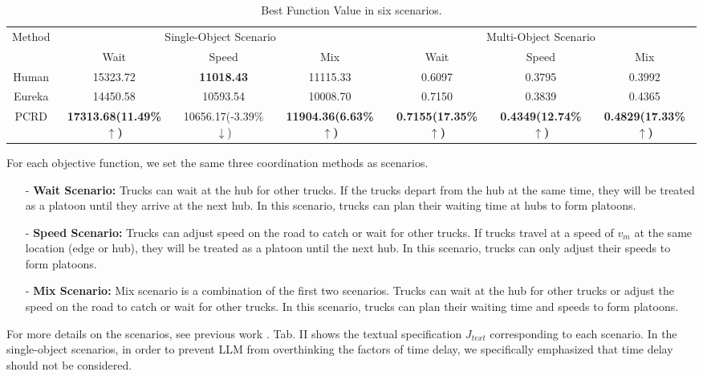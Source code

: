 \documentclass[lettersize,journal]{IEEEtran}
\begin{document}
\begin{table}[t]
\centering
\caption{Best Function Value in six scenarios.}
\begin{tabular}{ccccccc}
\toprule
\multirow{2}{*}{Method} & \multicolumn{3}{c}{Single-Object Scenario}                                                 & \multicolumn{3}{c}{Multi-Object Scenario}                                                     \\
\cmidrule(r){2-4} \cmidrule(r){5-7}
                        & Wait                       & Speed             & Mix                       & Wait                     & Speed                    & Mix                      \\
                        \cmidrule(r){1-1} \cmidrule(r){2-4} \cmidrule(r){5-7}
Human                   & 15323.72                   & \textbf{11018.43} & 11115.33                  & 0.6097                   & 0.3795                   & 0.3992                   \\
Eureka                  & 14450.58                   & 10593.54          & 10008.70                  & 0.7150                   & 0.3839                   & 0.4365                   \\
PCRD                    & \textbf{17313.68(11.49\%$\uparrow$)} & 10656.17(-3.39\%$\downarrow$) & \textbf{11904.36(6.63\%$\uparrow$)} & \textbf{0.7155(17.35\%$\uparrow$)} & \textbf{0.4349(12.74\%$\uparrow$)} & \textbf{0.4829(17.33\%$\uparrow$)} \\ \bottomrule
\end{tabular}
\end{table}

For each objective function, we set the same three coordination methods as scenarios.
\begin{itemize}
    \item [-] \textbf{Wait Scenario:} Trucks can wait at the hub for other trucks. 
    If the trucks depart from the hub at the same time, they will be treated as a platoon until they arrive at the next hub. 
    In this scenario, trucks can plan their waiting time at hubs to form platoons.
    \item [-] \textbf{Speed Scenario:} Trucks can adjust speed on the road to catch or wait for other trucks. 
    If trucks travel at a speed of $v_m$ at the same location (edge or hub), they will be treated as a platoon until the next hub.
    In this scenario, trucks can only adjust their speeds to form platoons.
    \item [-] \textbf{Mix Scenario:} Mix scenario is a combination of the first two scenarios. 
    Trucks can wait at the hub for other trucks or adjust the speed on the road to catch or wait for other trucks. 
    In this scenario, trucks can plan their waiting time and speeds to form platoons.
\end{itemize}
For more details on the scenarios, see previous work \cite{wei2023multi,wei2024multi}. 
Tab. II shows the textual specification $J_{text}$ corresponding to each scenario.
In the single-object scenarios, in order to prevent LLM from overthinking the factors of time delay, we specifically emphasized that time delay should not be considered.
\end{document}
